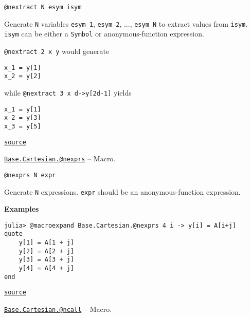 \begin{adjustwidth}{2em}{0pt}


\begin{verbatim}
@nextract N esym isym
\end{verbatim}

Generate \texttt{N} variables \texttt{esym\_1}, \texttt{esym\_2}, ..., \texttt{esym\_N} to extract values from \texttt{isym}. \texttt{isym} can be either a \texttt{Symbol} or anonymous-function expression.

\texttt{@nextract 2 x y} would generate


\begin{lstlisting}
x_1 = y[1]
x_2 = y[2]
\end{lstlisting}

while \texttt{@nextract 3 x d->y[2d-1]} yields


\begin{lstlisting}
x_1 = y[1]
x_2 = y[3]
x_3 = y[5]
\end{lstlisting}



\href{https://github.com/JuliaLang/julia/blob/44fa15b1502a45eac76c9017af94332d4557b251/base/cartesian.jl#L132-L149}{\texttt{source}}


\end{adjustwidth}
\hypertarget{17386123129446980507}{} 
\hyperlink{17386123129446980507}{\texttt{Base.Cartesian.@nexprs}}  -- {Macro.}

\begin{adjustwidth}{2em}{0pt}


\begin{verbatim}
@nexprs N expr
\end{verbatim}

Generate \texttt{N} expressions. \texttt{expr} should be an anonymous-function expression.

\textbf{Examples}


\begin{verbatim}
julia> @macroexpand Base.Cartesian.@nexprs 4 i -> y[i] = A[i+j]
quote
    y[1] = A[1 + j]
    y[2] = A[2 + j]
    y[3] = A[3 + j]
    y[4] = A[4 + j]
end
\end{verbatim}



\href{https://github.com/JuliaLang/julia/blob/44fa15b1502a45eac76c9017af94332d4557b251/base/cartesian.jl#L111-L126}{\texttt{source}}


\end{adjustwidth}
\hypertarget{16431416314224139891}{} 
\hyperlink{16431416314224139891}{\texttt{Base.Cartesian.@ncall}}  -- {Macro.}

